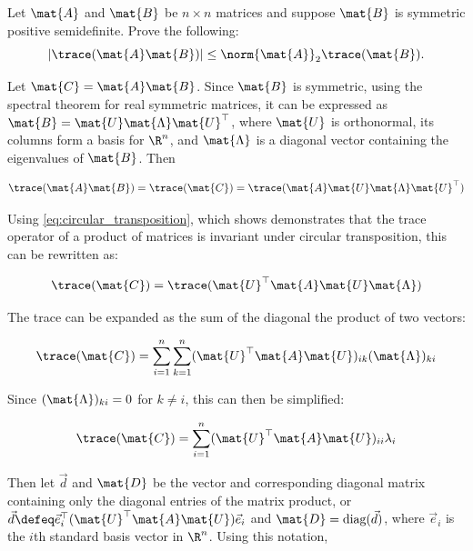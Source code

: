 \documentclass{template}
\begin{document}
\subsection{}
Let $\mat{A}$ and $\mat{B}$ be $n \times n$ matrices and suppose $\mat{B}$ 
is symmetric positive semidefinite. Prove the following:
\[
|\trace(\mat{A} \mat{B})| \leq \norm{\mat{A}}_2 \trace(\mat{B}).
\] 

Let $\mat{C} = \mat{A}\mat{B}$. Since $\mat{B}$ is symmetric, using the spectral theorem for real symmetric matrices, it can be expressed as $\mat{B} = \mat{U}\mat{\Lambda}\mat{U}^\top$, where $\mat{U}$ is orthonormal, its columns form a basis for $\R^n$, and $\mat{\Lambda}$ is a diagonal vector containing the eigenvalues of $\mat{B}$. Then

\begin{equation}
    \trace(\mat{A}\mat{B}) = \trace(\mat{C}) = \trace(\mat{A}\mat{U}\mat{\Lambda}\mat{U}^\top)
\end{equation}

Using \autoref{eq:circular_transposition}, which shows demonstrates that the trace operator of a product of matrices is invariant under circular transposition, this can be rewritten as:

\begin{equation}
    \trace(\mat{C}) = \trace(\mat{U}^\top\mat{A}\mat{U}\mat{\Lambda})
\end{equation}

The trace can be expanded as the sum of the diagonal the product of two vectors:

\begin{equation}
    \trace(\mat{C}) = \sum_{i=1}^n \sum_{k=1}^n (\mat{U}^\top\mat{A}\mat{U})_{ik}(\mat{\Lambda})_{ki}
\end{equation}

Since $(\mat{\Lambda})_{ki} = 0$ for $k\neq i$, this can then be simplified:

\begin{equation}
    \trace(\mat{C}) = \sum_{i=1}^n (\mat{U}^\top\mat{A}\mat{U})_{ii}\lambda_i
\end{equation}

Then let $\vec{d}$ and $\mat{D}$ be the vector and corresponding diagonal matrix containing only the diagonal entries of the matrix product, or $\vec{d} \defeq \vec{e}_i^\top(\mat{U}^\top\mat{A}\mat{U})\vec{e}_i$ and $\mat{D} = \text{diag}(\vec{d})$, where $\vec{e}_i$ is the $i$th standard basis vector in $\R^n$. Using this notation,
\end{document}
